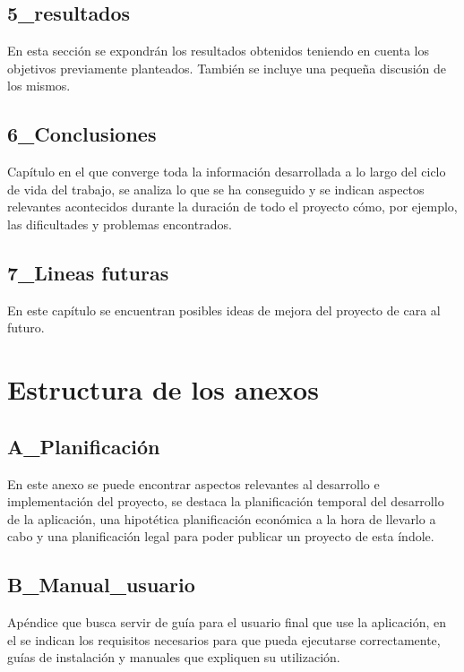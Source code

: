 \subsection{5\_resultados}

En esta sección se expondrán los resultados obtenidos teniendo en cuenta los objetivos previamente planteados. También se incluye una pequeña discusión de los mismos.

\subsection{6\_Conclusiones}

Capítulo en el que converge toda la información desarrollada a lo largo del ciclo de vida del trabajo, se analiza lo que se ha conseguido y se indican aspectos relevantes acontecidos durante la duración de todo el proyecto cómo, por ejemplo, las dificultades y problemas encontrados.

\subsection{7\_Lineas futuras}

En este capítulo se encuentran posibles ideas de mejora del proyecto de cara al futuro. 

\section{Estructura de los anexos}

\subsection{A\_Planificación}

En este anexo se puede encontrar aspectos relevantes al desarrollo e implementación del proyecto, se destaca la planificación temporal del desarrollo de la aplicación, una hipotética planificación económica a la hora de llevarlo a cabo y una planificación legal para poder publicar un proyecto de esta índole. 

\subsection{B\_Manual\_usuario}

Apéndice que busca servir de guía para el usuario final que use la aplicación, en el se indican los requisitos necesarios para que pueda ejecutarse correctamente, guías de instalación y manuales que expliquen su utilización.

